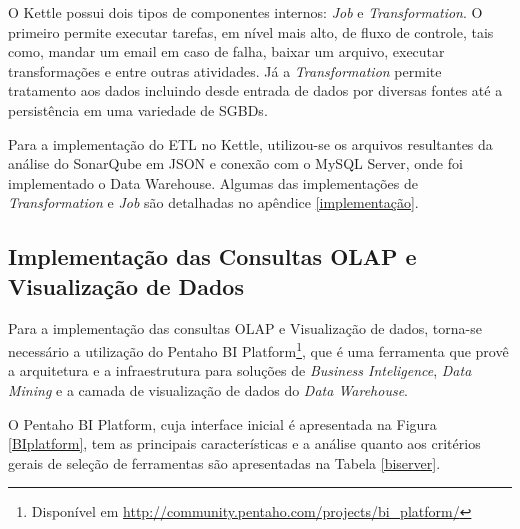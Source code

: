 \FloatBarrier	

O Kettle possui dois tipos de componentes internos: \textit{Job} e \textit{Transformation}. O primeiro permite executar tarefas, em nível mais alto, de fluxo de controle, tais como, mandar um email em caso de falha, baixar um arquivo, executar transformações  e entre outras atividades. Já a \textit{Transformation} permite tratamento aos dados incluindo desde entrada de dados por diversas fontes até a persistência em uma variedade de SGBDs.


Para a implementação do ETL no Kettle, utilizou-se os arquivos resultantes da análise do SonarQube em JSON e conexão com o MySQL Server, onde foi implementado o Data Warehouse. Algumas das implementações  de \textit{Transformation} e \textit{Job} são detalhadas no apêndice \ref{implementação}.


\subsection{Implementação das Consultas OLAP e Visualização de Dados}

Para a implementação das consultas OLAP e Visualização de dados, torna-se necessário a utilização do Pentaho BI Platform\footnote{Disponível em \url{http://community.pentaho.com/projects/bi_platform/}}, que é uma ferramenta que provê a arquitetura e a infraestrutura para soluções de \textit{Business Inteligence}, \textit{Data Mining} e a camada de visualização de dados do \textit{Data Warehouse}.


O Pentaho BI Platform, cuja interface inicial é apresentada na Figura \ref{BIplatform}, tem as principais características e a análise quanto aos critérios gerais de seleção de ferramentas são apresentadas na Tabela \ref{biserver}. 


